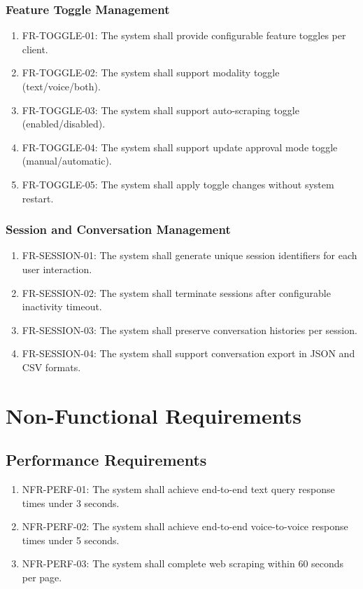 \subsubsection{Feature Toggle Management}

\begin{enumerate}[leftmargin=*]
    \item FR-TOGGLE-01: The system shall provide configurable feature toggles per client.
    \item FR-TOGGLE-02: The system shall support modality toggle (text/voice/both).
    \item FR-TOGGLE-03: The system shall support auto-scraping toggle (enabled/disabled).
    \item FR-TOGGLE-04: The system shall support update approval mode toggle (manual/automatic).
    \item FR-TOGGLE-05: The system shall apply toggle changes without system restart.
\end{enumerate}

\subsubsection{Session and Conversation Management}

\begin{enumerate}[leftmargin=*]
    \item FR-SESSION-01: The system shall generate unique session identifiers for each user interaction.
    \item FR-SESSION-02: The system shall terminate sessions after configurable inactivity timeout.
    \item FR-SESSION-03: The system shall preserve conversation histories per session.
    \item FR-SESSION-04: The system shall support conversation export in JSON and CSV formats.
\end{enumerate}

\section{Non-Functional Requirements}

\subsection{Performance Requirements}

\begin{enumerate}[leftmargin=*]
    \item NFR-PERF-01: The system shall achieve end-to-end text query response times under 3 seconds.
    \item NFR-PERF-02: The system shall achieve end-to-end voice-to-voice response times under 5 seconds.
    \item NFR-PERF-03: The system shall complete web scraping within 60 seconds per page.
\end{enumerate}

